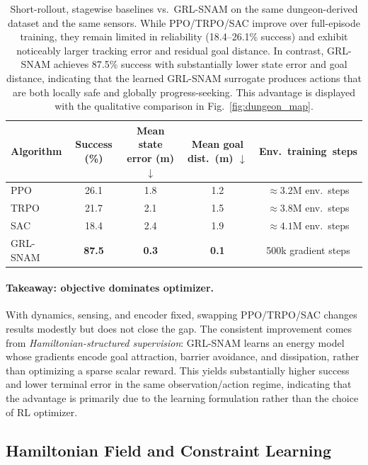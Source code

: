 \documentclass{article} %
\begin{document}
\begin{table}[htbp]
\centering
\caption[Stagewise short-rollout baselines vs.\ GRL-SNAM]{
Short-rollout, stagewise baselines vs.\ GRL-SNAM on the same dungeon-derived dataset and the same sensors.
While PPO/TRPO/SAC improve over full-episode training, they remain limited in reliability
(18.4--26.1\% success) and exhibit noticeably larger tracking error and residual goal distance.
In contrast, GRL-SNAM achieves 87.5\% success with substantially lower state error and goal distance, indicating that the learned GRL-SNAM surrogate produces actions that are both locally safe and globally progress-seeking. This advantage is displayed with the qualitative comparison in Fig.~\ref{fig:dungeon_map}.%
}

\small
\begin{tabular}{lcccc}
\toprule
Algorithm & Success (\%) & Mean state error (m) $\downarrow$ & Mean goal dist.\ (m) $\downarrow$ & Env.\ training\ steps \\
\midrule
PPO      & 26.1 & 1.8 & 1.2 & $\approx 3.2$M env.\ steps \\
TRPO     & 21.7 & 2.1 & 1.5 & $\approx 3.8$M env.\ steps \\
SAC      & 18.4 & 2.4 & 1.9 & $\approx 4.1$M env.\ steps \\
GRL-SNAM & \textbf{87.5} & \textbf{0.3} & \textbf{0.1} & 500k gradient steps \\
\bottomrule
\end{tabular}
\label{tab:short_rollout_rl}
\end{table}

\paragraph{Takeaway: objective dominates optimizer.}
With dynamics, sensing, and encoder fixed, swapping PPO/TRPO/SAC changes results modestly but does not close the gap.
The consistent improvement comes from \emph{Hamiltonian-structured supervision}: GRL-SNAM learns an energy model whose gradients encode goal attraction, barrier avoidance, and dissipation, rather than optimizing a sparse scalar reward.
This yields substantially higher success and lower terminal error in the same observation/action regime, indicating that the advantage is primarily due to the learning formulation rather than the choice of RL optimizer.


\subsection{Hamiltonian Field and Constraint Learning}
\label{subsec:hamiltonian_analysis}
\end{document}
